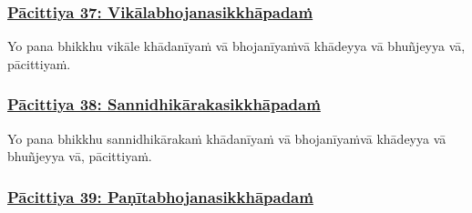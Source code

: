\subsubsection*{\hyperref[exp37]{Pācittiya 37: Vikālabhojanasikkhāpadaṁ}}
\label{pac37}

Yo pana bhikkhu vikāle khādanīyaṁ vā bhojanīyaṁ\makeatletter\hyperlink{endnote299-appendix}\makeatother \thinspace vā khādeyya vā bhuñjeyya vā, pācittiyaṁ.



\subsubsection*{\hyperref[exp38]{Pācittiya 38: Sannidhikārakasikkhāpadaṁ}}
\label{pac38}

Yo pana bhikkhu sannidhikārakaṁ khādanīyaṁ vā bhojanīyaṁ\makeatletter\hyperlink{endnote300-appendix}\makeatother \thinspace vā khādeyya vā bhuñjeyya vā, pācittiyaṁ.



\subsubsection*{\hyperref[exp39]{Pācittiya 39: Paṇītabhojanasikkhāpadaṁ}}
\label{pac39}

